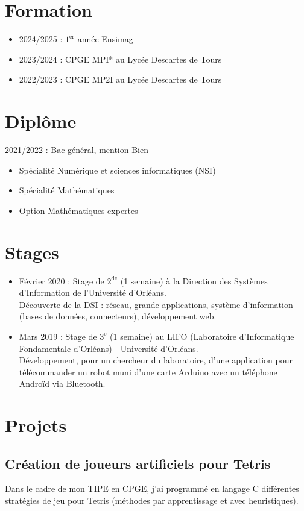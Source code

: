 \documentclass[11pt,oneside,a4paper,titlepage]{article}
\begin{document}
\begin{tcolorbox}
\begin{minipage}[t]{11cm}
\begin{tcolorbox}[grow to right by=0.75cm,colframe=white,colback=white]
      \section*{Formation}
      \begin{itemize}
        \item{2024/2025 : $1^{\text{er}}$ année Ensimag}
        \item{2023/2024 : CPGE MPI* au Lycée Descartes de Tours}
        \item{2022/2023 : CPGE MP2I au Lycée Descartes de Tours}
      \end{itemize}

      \section*{Diplôme}
      2021/2022 : Bac général, mention Bien
      \begin{itemize}
        \item{Spécialité Numérique et sciences informatiques (NSI)}
        \item{Spécialité Mathématiques}
        \item{Option Mathématiques expertes}
      \end{itemize}

      \section*{Stages}
      \begin{itemize}
        \item{Février 2020 : Stage de $2^{\text{de}}$ (1 semaine) à la Direction des Systèmes d'Information de l'Université d'Orléans.\\Découverte de la DSI : réseau, grande applications, système d'information (bases de données, connecteurs), développement web.}
        \item{Mars 2019 : Stage de $3^{\text{e}}$ (1 semaine) au LIFO (Laboratoire d'Informatique Fondamentale d'Orléans) - Université d'Orléans.\\Développement, pour un chercheur du laboratoire, d'une application pour télécommander un robot muni d'une carte Arduino avec un téléphone Androïd via Bluetooth.}
      \end{itemize}

      \section*{Projets}
      \subsection*{Création de joueurs artificiels pour Tetris}
      Dans le cadre de mon TIPE en CPGE, j'ai programmé en langage C différentes stratégies de jeu pour Tetris (méthodes par apprentissage et avec heuristiques).

\end{tcolorbox}
\end{minipage}
\end{tcolorbox}
\end{document}
